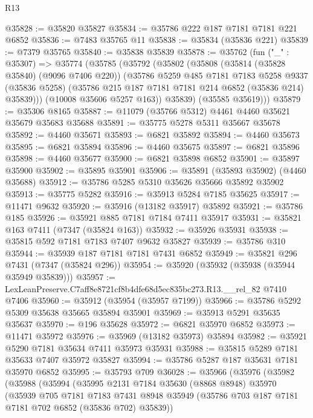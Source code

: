 \begin{lexlean}{R13}
\begin{coremodule}
@35828 := @35820 @35827
@35834 := @35786 @222 @187 @7181 @7181 @221 @6852
@35836 := @7483 @35765 @11
@35838 := @35834 (@35836 @221)
@35839 := @7379 @35765
@35840 := @35838 @35839
@35878 := @35762
    (fun ("_" : @35307) =>
    @35774
      (@35785
        (@35792
          (@35802
            (@35808
              (@35814 (@35828 @35840) (@9096 @7406 @220))
              (@35786
                @5259
                @485
                @7181
                @7183
                @5258
                @9337
                (@35836 @5258)
                (@35786 @215 @187 @7181 @7181 @214 @6852 (@35836 @214) @35839)))
            (@10008 @35606 @5257 @163))
          @35839)
        (@35585 @35619)))
@35879 := @35306 @8165
@35887 := @11079 (@35766 @5312) @4461 @4460 @35621 @35679 @35683 @35688
@35891 := @35775 @5278 @5311 @35667 @35678
@35892 := @4460 @35671
@35893 := @6821 @35892
@35894 := @4460 @35673
@35895 := @6821 @35894
@35896 := @4460 @35675
@35897 := @6821 @35896
@35898 := @4460 @35677
@35900 := @6821 @35898 @6852
@35901 := @35897 @35900
@35902 := @35895 @35901
@35906 := @35891 (@35893 @35902) (@4460 @35688)
@35912 := @35786 @5285 @5310 @35626 @35666 @35892 @35902
@35913 := @35775 @5282
@35916 := @35913 @5284 @7185 @35625
@35917 := @11471 @9632
@35920 := @35916 (@13182 @35917) @35892
@35921 := @35786 @185
@35926 := @35921 @885 @7181 @7184 @7411 @35917
@35931 := @35821 @163 @7411 (@7347 (@35824 @163))
@35932 := @35926 @35931
@35938 := @35815 @592 @7181 @7183 @7407 @9632 @35827
@35939 := @35786 @310
@35944 := @35939 @187 @7181 @7181 @7431 @6852
@35949 := @35821 @296 @7431 (@7347 (@35824 @296))
@35954 := @35920 (@35932 (@35938 (@35944 @35949 @35839)))
@35957 := LexLeanPreserve.C7aff8e8721cf8b4dfe68d5ec835bc273.R13.__rel_82 @7410 @7406
@35960 := @35912 (@35954 (@35957 @7199))
@35966 := @35786 @5292 @5309 @35638 @35665 @35894 @35901
@35969 := @35913 @5291 @35635 @35637
@35970 := @196 @35628
@35972 := @6821 @35970 @6852
@35973 := @11471 @35972
@35976 := @35969 (@13182 @35973) @35894
@35982 := @35921 @5290 @7181 @35634 @7411 @35973 @35931
@35988 := @35815 @5289 @7181 @35633 @7407 @35972 @35827
@35994 := @35786 @5287 @187 @35631 @7181 @35970 @6852
@35995 := @35793 @709
@36028 := @35966
    (@35976
      (@35982
        (@35988
          (@35994
            (@35995
              @2131
              @7184
              @35630
              (@8868 @8948)
              @35970
              (@35939
                @705
                @7181
                @7183
                @7431
                @8948
                @35949
                (@35786 @703 @187 @7181 @7181 @702 @6852 (@35836 @702) @35839))

\end{coremodule}
\end{lexlean}
